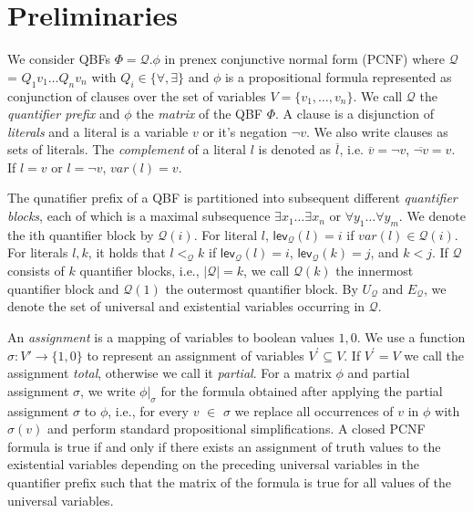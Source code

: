 \documentclass[runningheads]{llncs}
\newcommand{\var}{\mathit{var}}
\newcommand{\matrixf}{\phi}
\newcommand{\qp}{\mathcal{Q}}
\newcommand{\FFF}{\Phi}
\newcommand{\0}{0}
\newcommand{\1}{1}
\def\universals{U_\mathcal{Q}}
\def\existentials{E_\mathcal{Q}}
\def\qlvl{\mathsf{lev_\qp}}
\begin{document}
\section{Preliminaries}
\label{sec:pre}

We consider QBFs $\FFF = {\qp}.\matrixf$ in prenex conjunctive normal form (PCNF) where $\qp$ = $Q_{1} v_{1} \ldots Q_{n} v_{n}$ with $Q_{i} \in \{\forall, \exists \}$ and $\matrixf$ is a propositional formula represented as conjunction of clauses over the set of variables $V = \{v_{1}, \ldots, v_{n}\}$. We call $\qp$ the \textit{quantifier prefix} and $\matrixf$ the \textit{matrix} of the QBF $\Phi$. A clause is a disjunction of \textit{literals} and a literal is a variable $v$ or it's negation $\neg v$. We also write clauses as sets of literals. The \textit{complement} of a literal $l$ is denoted as $\overline{l}$, i.e. $\overline{v} = \neg v$, $\overline{\neg{v}} = v$. If $l = v$ or $l = \neg v$, $\var(l) = v$.

The qunatifier prefix of a QBF is partitioned into subsequent different \textit{quantifier blocks}, each of which is a maximal subsequence $\exists x_{1} \ldots \exists x_{n}$ or $\forall y_{1} \ldots \forall y_{m}$. We denote the ith quantifier block by $\qp(i)$. For literal $l$, $\qlvl(l) = i$ if $\var(l) \in \qp(i)$. For literals $l, k$, it holds that $l <_\qp k$ if $\qlvl(l) = i$, $\qlvl(k) = j$, and $k < j$. If $\qp$ consists of $k$ quantifier blocks, i.e., $|\qp| = k$,  we call $\qp({k})$ the innermost quantifier block and $\qp({1})$ the outermost quantifier block. By $\universals$ and $\existentials$, we denote the set of universal and existential variables occurring in $\qp$. 

An \textit{assignment} is a mapping of variables to boolean values $\1, \0$. We use a function $\sigma \colon V' \to \{\1, \0 \}$ to represent an assignment of variables $V^{\prime} \subseteq V$. If $V^{\prime} = V$ we call the assignment \emph{total}, otherwise we call it \emph{partial}. For a matrix $\matrixf$ and partial assignment $\sigma$, we write $\matrixf|_{\sigma}$ for the formula obtained after applying the partial assignment $\sigma$ to $\matrixf$, i.e., for every $v$ $\in$ $\sigma$ we replace all occurrences of $v$ in $\phi$ with $\sigma(v)$ and perform standard propositional simplifications.
A closed PCNF formula is true if and only if there exists an assignment of truth values to the existential variables depending on the preceding universal variables in the quantifier prefix such that the matrix of the formula is true for all values of the universal variables.
%
\end{document}
